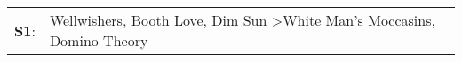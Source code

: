 \begin{supertabular}{p{0.03\textwidth}p{0.92\textwidth}}
 \textbf{S1}:  &  Wellwishers\textsuperscript{}, \enspace Booth Love\textsuperscript{}, \enspace Dim Sun\textsuperscript{} \textgreater \enspace White Man's Moccasins\textsuperscript{}, \enspace Domino Theory\textsuperscript{}  \enspace  \\
\end{supertabular}
